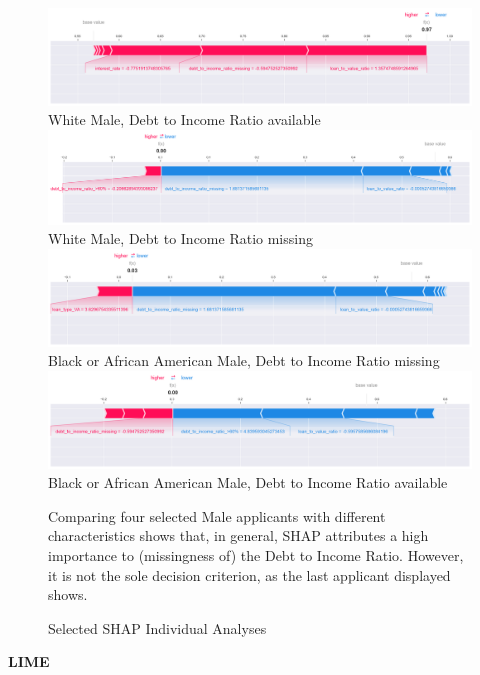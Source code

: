 \begin{figure}[h]
    \centering
    \includegraphics[width=1\textwidth]{images/SHAP_Individual_Analyses/SHAP_individual_0.png}
    \small
    White Male, Debt to Income Ratio available
    \includegraphics[width=1\textwidth]{images/SHAP_Individual_Analyses/SHAP_individual_1.png}
    \small
    White Male, Debt to Income Ratio missing
    \includegraphics[width=1\textwidth]{images/SHAP_Individual_Analyses/SHAP_individual_21.png}
    \small
    Black or African American Male, Debt to Income Ratio missing
    \includegraphics[width=1\textwidth]{images/SHAP_Individual_Analyses/SHAP_individual_139.png}
    \small
    Black or African American Male, Debt to Income Ratio available
    \caption{Selected SHAP Individual Analyses}
    \medskip
    \small
    Comparing four selected Male applicants with different characteristics shows that, in general, SHAP attributes a high importance to (missingness of) the Debt to Income Ratio. However, it is not the sole decision criterion, as the last applicant displayed shows.
    \label{fig:SHAP_Individual_Analyses}
\end{figure}

\textbf{LIME}



